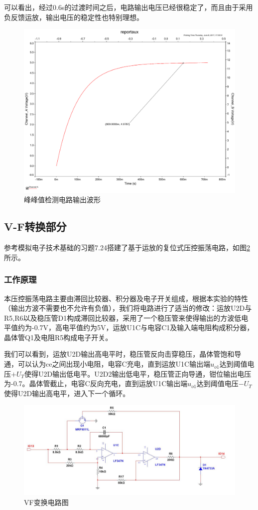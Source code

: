 \documentclass[UTF8,a4paper]{paper}
\begin{document}
可以看出，经过0.6s的过渡时间之后，电路输出电压已经很稳定了，而且由于采用负反馈运放，输出电压的稳定性也特别理想。
\begin{figure}[h]
\centering
\includegraphics[width=\textwidth]{f4.pdf}
\caption{峰峰值检测电路输出波形}
\label{f4}
\end{figure}

\subsection{V-F转换部分}
参考模拟电子技术基础的习题7.24搭建了基于运放的复位式压控振荡电路，如图\ref{f5}所示。

\subsubsection{工作原理}
本压控振荡电路主要由滞回比较器、积分器及电子开关组成，根据本实验的特性（输出方波不需要也不允许有负值），我们将电路进行了适当的修改：运放U2D与R5,R6以及稳压管D1构成滞回比较器，采用了一个稳压管来使得输出的方波低电平值约为-0.7V，高电平值约为5V，运放U1C与电容C1及输入端电阻构成积分器，晶体管Q1及电阻R5构成电子开关。

我们可以看到，运放U2D输出高电平时，稳压管反向击穿稳压，晶体管饱和导通，可以认为ce之间出现小电阻，电容C充电，直到运放U1C输出端$u_{o1}$达到阈值电压$+U_T$使得U2D输出低电平。U2D2输出低电平，稳压管正向导通，钳位输出电压为-0.7。晶体管截止，电容C反向充电，直到运放U1C输出端$u_{o1}$达到阈值电压$-U_T$使得U2D输出高电平，进入下一个循环。
\begin{figure}[h]
\centering
\includegraphics[width=\textwidth]{VF.jpg}
\caption{VF变换电路图}
\label{f5}
\end{figure}
\end{document}
